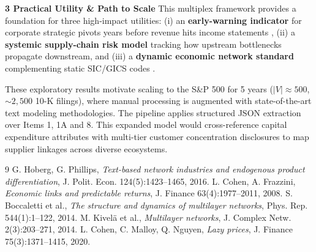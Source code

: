 \documentclass[10pt,letterpaper,twocolumn]{article}
\begin{document}
\vspace*{0.1cm}
\noindent\textbf{3 Practical Utility \& Path to Scale}
This multiplex framework provides a foundation for three high-impact utilities: (i) an \textbf{early-warning indicator} 
for corporate strategic pivots years before revenue hits income statements \cite{cohen2020}, (ii) a \textbf{systemic supply-chain risk model} 
tracking how upstream bottlenecks propagate downstream, and (iii) a \textbf{dynamic economic network standard} 
complementing static SIC/GICS codes \cite{hoberg2016}.

These exploratory results motivate scaling to the S\&P 500 for 5 years ($|V| \approx 500$, $\sim 2,500$ 10-K filings), 
where manual processing is augmented with state-of-the-art text modeling methodologies. 
The pipeline applies structured JSON extraction over Items 1, 1A and 8.
This expanded model would cross-reference capital expenditure attributes with multi-tier customer concentration disclosures to map supplier linkages across diverse ecosystems.


\begin{thebibliography}{9}
    \vspace*{-.495cm}
    \setlength{\itemsep}{0pt}
    \setlength{\parskip}{0pt}
    \setlength{\parsep}{0pt}
     G. Hoberg, G. Phillips, \textit{Text-based network industries and endogenous product differentiation}, J. Polit. Econ. 124(5):1423--1465, 2016.
     L. Cohen, A. Frazzini, \textit{Economic links and predictable returns}, J. Finance 63(4):1977--2011, 2008.
     S. Boccaletti et al., \textit{The structure and dynamics of multilayer networks}, Phys. Rep. 544(1):1--122, 2014.
     M. Kivel\"a et al., \textit{Multilayer networks}, J. Complex Netw. 2(3):203--271, 2014.
     L. Cohen, C. Malloy, Q. Nguyen, \textit{Lazy prices}, J. Finance 75(3):1371--1415, 2020.
    \end{thebibliography}
\end{document}
